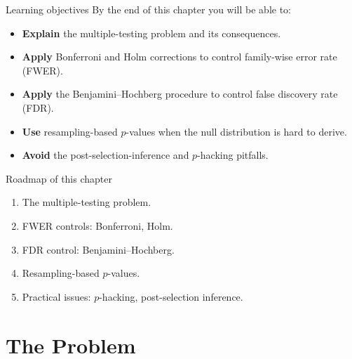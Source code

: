 \documentclass[aspectratio=169,11pt]{beamer}
\begin{document}
\begin{frame}{Learning objectives}
  By the end of this chapter you will be able to:
  \begin{itemize}
    \item \textbf{Explain} the multiple-testing problem and its
          consequences.
    \item \textbf{Apply} Bonferroni and Holm corrections to control
          family-wise error rate (FWER).
    \item \textbf{Apply} the Benjamini--Hochberg procedure to control
          false discovery rate (FDR).
    \item \textbf{Use} resampling-based $p$-values when the null
          distribution is hard to derive.
    \item \textbf{Avoid} the post-selection-inference and
          $p$-hacking pitfalls.
  \end{itemize}
\end{frame}


\begin{frame}{Roadmap of this chapter}
  \begin{takeaway}
    \begin{enumerate}
      \item The multiple-testing problem.
      \item FWER controls: Bonferroni, Holm.
      \item FDR control: Benjamini--Hochberg.
      \item Resampling-based $p$-values.
      \item Practical issues: $p$-hacking, post-selection inference.
    \end{enumerate}
  \end{takeaway}
\end{frame}


\section{The Problem}
\end{document}
